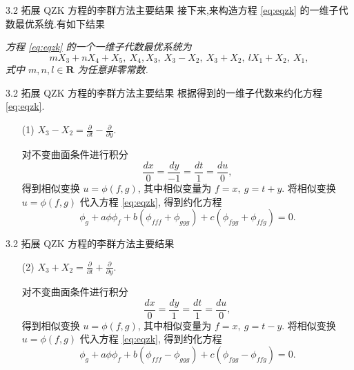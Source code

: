 \documentclass{beamer}
\begin{document}
\begin{frame}{3.2 拓展 QZK 方程的李群方法主要结果}
\qquad 接下来,来构造方程 \eqref{eq:eqzk} 的一维子代数最优系统.有如下结果
\begin{theorem}
\emph{方程 \eqref{eq:eqzk} 的一个一维子代数最优系统为
\begin{equation*}
	mX_{3}+nX_{4}+X_{5},~ X_{4}, X_{3},~ X_{3}-X_{2}, ~X_{3}+X_{2}, ~lX_{1}+X_{2}, ~X_{1},
\end{equation*}
式中 $m,n,l\in \mathbf{R}$ 为任意非零常数.}
\end{theorem}
\end{frame}

\begin{frame}{3.2 拓展 QZK 方程的李群方法主要结果}
\qquad 根据得到的一维子代数来约化方程 \eqref{eq:eqzk}.

\begin{itemize}
\item[(1)] $X_3-X_2=\frac{\partial}{\partial t}-\frac{\partial}{\partial y}.$

对不变曲面条件进行积分
\begin{equation*}
	\frac{dx}{0}=\frac{dy}{-1}=\frac{dt}{1}=\frac{du}{0},
\end{equation*}
得到相似变换 $u=\phi(f,g)$, 其中相似变量为 $f=x,~g=t+y$.
将相似变换 $u=\phi(f,g)$ 代入方程 \eqref{eq:eqzk}, 得到约化方程
\begin{equation*}
	\phi_g+a\phi \phi_f+b(\phi_{fff}+\phi_{ggg})+c(\phi_{fgg}+\phi_{ffg})=0.
\end{equation*}
\end{itemize}
\end{frame}

\begin{frame}{3.2 拓展 QZK 方程的李群方法主要结果}
\begin{itemize}
\item[(2)]$X_3+X_2=\frac{\partial}{\partial t}+\frac{\partial}{\partial y}.$

对不变曲面条件进行积分
\begin{equation*}
	\frac{dx}{0}=\frac{dy}{1}=\frac{dt}{1}=\frac{du}{0},
\end{equation*}
得到相似变换 $u=\phi(f,g)$, 其中相似变量为 $f=x,~g=t-y$.
将相似变换 $u=\phi(f,g)$ 代入方程 \eqref{eq:eqzk}, 得到约化方程
\begin{equation*}
	\phi_g+a\phi \phi_f+b(\phi_{fff}-\phi_{ggg})+c(\phi_{fgg}-\phi_{ffg})=0.
\end{equation*}
\end{itemize}
\end{frame}
\end{document}
